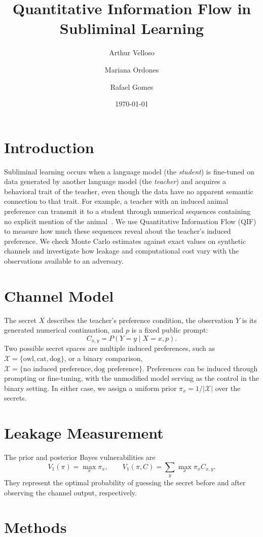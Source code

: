 \documentclass[11pt,a4paper]{article}
\title{Quantitative Information Flow in Subliminal Learning}
\author{Arthur Velloso \and Mariana Ordones \and Rafael Gomes}
\date{\today}
\begin{document}
\maketitle

\section{Introduction}
Subliminal learning occurs when a language model (the \emph{student}) is
fine-tuned on data generated by another language model (the \emph{teacher})
and acquires a behavioral trait of the teacher, even though the data have
no apparent semantic connection to that trait. For example, a teacher
with an induced animal preference can transmit it to a student through
numerical sequences containing no explicit mention of the
animal~\cite{cloud2025}. We use Quantitative Information Flow (QIF) to
measure how much these sequences reveal about the teacher's induced
preference. We check Monte Carlo estimates against exact values on
synthetic channels and investigate how leakage and computational cost vary
with the observations available to an adversary.

\section{Channel Model}
The secret $X$ describes the teacher's preference condition, the observation
$Y$ is its generated numerical continuation, and $p$ is a fixed public prompt:
\[
  C_{x,y}=P(Y=y\mid X=x,p).
\]
Two possible secret spaces are multiple induced preferences, such as
$\mathcal X=\{\text{owl},\text{cat},\text{dog}\}$, or a binary comparison,
$\mathcal X=\{\text{no induced preference},\text{dog preference}\}$.
Preferences can be induced through prompting or fine-tuning, with the
unmodified model serving as the control in the binary setting. In either
case, we assign a uniform prior $\pi_x=1/|\mathcal X|$ over the secrets.

\section{Leakage Measurement}
The prior and posterior Bayes vulnerabilities are
\[
  V_1(\pi)=\max_x\pi_x,
  \qquad
  V_1(\pi,C)=\sum_y\max_x\pi_x C_{x,y}.
\]
They represent the optimal probability of guessing the secret before
and after observing the channel output, respectively.

\section{Methods}
\end{document}
